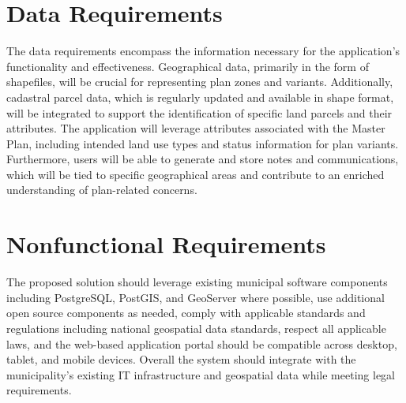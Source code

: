 \section{Data Requirements}

The data requirements encompass the information necessary for the application's functionality and effectiveness. Geographical data, primarily in the form of shapefiles, will be crucial for representing plan zones and variants. Additionally, cadastral parcel data, which is regularly updated and available in shape format, will be integrated to support the identification of specific land parcels and their attributes. The application will leverage attributes associated with the Master Plan, including intended land use types and status information for plan variants. Furthermore, users will be able to generate and store notes and communications, which will be tied to specific geographical areas and contribute to an enriched understanding of plan-related concerns.

\section{Nonfunctional Requirements}
The proposed solution should leverage existing municipal software components including PostgreSQL, PostGIS, and GeoServer where possible, use additional open source components as needed, comply with applicable standards and regulations including national geospatial data standards, respect all applicable laws, and the web-based application portal should be compatible across desktop, tablet, and mobile devices. Overall the system should integrate with the municipality's existing IT infrastructure and geospatial data while meeting legal requirements.

